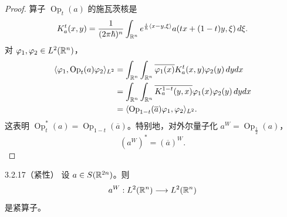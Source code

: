 \begin{proof}
算子 $\operatorname{Op}_t(a)$ 的施瓦茨核是
\[
K_a^t(x,y)=\frac{1}{(2\pi\hbar)^n}\int_{\mathbb{R}^n}e^{\frac i\hbar\langle x-y,\xi\rangle}a(tx+(1-t)y,\xi)\,d\xi.
\]
对 $\varphi_1,\varphi_2\in L^2(\mathbb{R}^n)$，
\begin{align*}
\langle\varphi_1,\operatorname{Op}_t(a)\varphi_2\rangle_{L^2}
&=\int_{\mathbb{R}^n}\int_{\mathbb{R}^n}\overline{\varphi_1(x)}K_a^t(x,y)\varphi_2(y)\,dydx\\
&=\int_{\mathbb{R}^n}\int_{\mathbb{R}^n}\overline{K_a^{1-t}(y,x)}\varphi_1(x)\varphi_2(y)\,dydx\\
&=\langle\operatorname{Op}_{1-t}(\overline a)\varphi_1,\varphi_2\rangle_{L^2}.
\end{align*}
这表明 $\operatorname{Op}_t^*(a)=\operatorname{Op}_{1-t}(\overline a)$。特别地，对外尔量子化 $a^W=\operatorname{Op}_{\frac12}(a)$，
\[
(a^W)^*=(\overline a)^W.
\]
\end{proof}


\begin{theorem}{3.2.17}（紧性）
设 $a\in S(\mathbb{R}^{2n})$。则
\[
a^W:L^2(\mathbb{R}^n)\longrightarrow L^2(\mathbb{R}^n)
\]
是紧算子。
\end{theorem}

